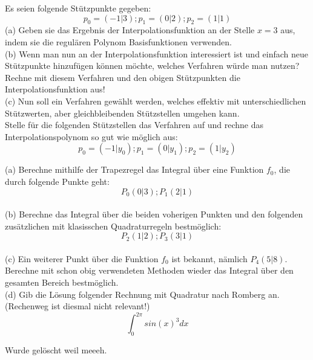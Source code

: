 \documentclass{scrartcl}
\begin{document}

	Es seien folgende Stützpunkte gegeben:
	$$p_0 = (-1 | 3); p_1 = (0 | 2); p_2 = (1 | 1)$$
	\n
	(a)
	Geben sie das Ergebnis der Interpolationsfunktion an der Stelle $x = 3$ aus, indem sie die regulären Polynom Basisfunktionen verwenden.
	\lbreak \lbreak \lbreak \lbreak
	\\
	(b)
	Wenn man nun an der Interpolationsfunktion interessiert ist und einfach neue Stützpunkte hinzufügen können möchte, welches Verfahren würde man nutzen? \\
	Rechne mit diesem Verfahren und den obigen Stützpunkten die Interpolationsfunktion aus!
	\lbreak \lbreak \lbreak \lbreak
	\\
	(c)
	Nun soll ein Verfahren gewählt werden, welches effektiv mit unterschiedlichen Stützwerten, aber gleichbleibenden Stützstellen umgehen kann.\\
	Stelle für die folgenden Stützstellen das Verfahren auf und rechne das Interpolationspolynom so gut wie möglich aus:
	$$p_0 = (-1 | y_0); p_1 = (0 | y_1); p_2 = (1 | y_2)$$


	\lbreak
	
	(a)
	Berechne mithilfe der Trapezregel das Integral über eine Funktion $f_0$, die durch folgende Punkte geht: $$P_0(0|3); P_1(2|1)$$
	\lbreak \lbreak \lbreak \lbreak
	\\
	(b)
	Berechne das Integral über die beiden voherigen Punkten und den folgenden zusätzlichen mit klasisschen Quadraturregeln bestmöglich: $$P_2(1|2); P_3(3|1)$$
	\lbreak \lbreak \lbreak \lbreak
	\\
	(c) 
	Ein weiterer Punkt über die Funktion $f_0$ ist bekannt, nämlich $P_4(5|8)$. Berechne mit schon obig verwendeten Methoden wieder das Integral über den gesamten Bereich bestmöglich.
	\lbreak \lbreak \lbreak \lbreak
	\\
	(d)
	Gib die Lösung folgender Rechnung mit Quadratur nach Romberg an. \\(Rechenweg ist diesmal nicht relevant!)
	$$\int_{0}^{2 \pi}sin(x)^3dx$$


Wurde gelöscht weil meeeh.
\end{document}
